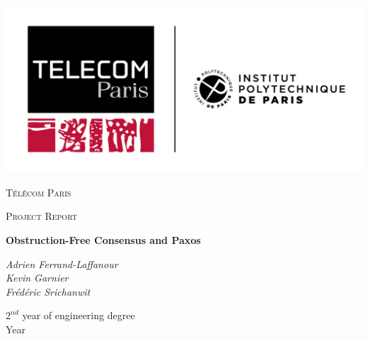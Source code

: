 \documentclass[12pt,a4paper]{report}
\begin{document}
\begin{titlepage}
	\centering
	\includegraphics[width=1\textwidth]{logo_telecom.png}\par
	{\textsc{Télécom Paris} \par}
	\vfill
	\vfill
	{\Large \textsc{Project Report}\par}
	\vspace{1.5cm}
	{\huge\bfseries Obstruction-Free Consensus and Paxos\\}
	\vspace{4cm}
	\begin{large}
		{\Large\itshape Adrien Ferrand-Laffanour\\}
		{\Large\itshape Kevin Garnier\\}
		{\Large\itshape Frédéric Srichanwit\\}
	\end{large}

	\vfill

	\vfill

	{\large $2^{nd}$ year of engineering degree\\Year \the\year \par}
\end{titlepage}
\end{document}
